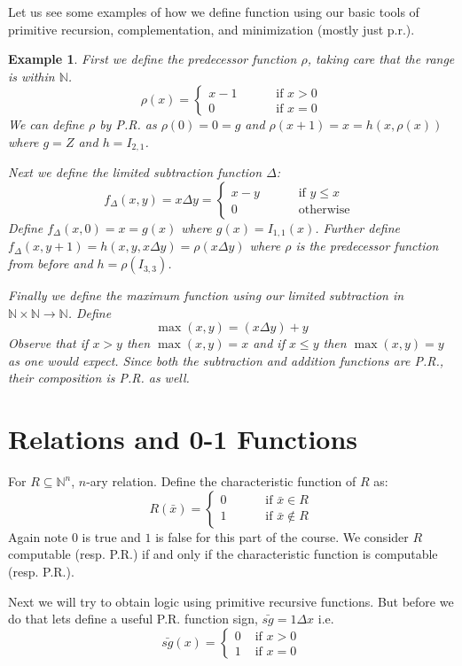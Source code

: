 \documentclass[twoside]{article}
\newtheorem{example}[theorem]{Example}
\def\N{\mathbb{N}}
\begin{document}
Let us see some examples of how we define function using our basic tools of primitive recursion, complementation, and minimization (mostly just p.r.).
\begin{example}
First we define the predecessor function $\rho$, taking care that the range is within $\N$. 
\[\rho(x) = \begin{cases}
x - 1 &\qquad \mbox{ if } x > 0 \\
0 &\qquad \mbox{ if } x = 0
\end{cases}\]
We can define $\rho$ by P.R. as $\rho (0) = 0 = g$ and $\rho(x+1) = x = h(x, \rho(x))$ where $g = Z$ and $h = I_{2,1}$. 

Next we define the limited subtraction function $\Delta$:
\[f_{\Delta}(x,y) = x \Delta y = \begin{cases}
x - y &\qquad \mbox{ if } y \leq x \\
0 &\qquad \mbox{ otherwise } 
\end{cases}\]
Define $f_{\Delta}(x, 0) = x = g(x)$ where $g(x) = I_{1,1}(x)$. Further define $f_{\Delta}(x, y+1) = h(x,y,x \Delta y) = \rho(x \Delta y)$ where $\rho$ is the predecessor function from before and $h = \rho(I_{3,3})$. 

Finally we define the maximum function using our limited subtraction in $\N \times \N \rightarrow \N$. Define
\[\max (x,y) = (x \Delta y) + y\]
Observe that if $x > y$ then $\max (x,y) = x$ and if $x \leq y$ then $\max (x,y) = y$ as one would expect. Since both the subtraction and addition functions are P.R., their composition is P.R. as well.
\end{example}

\section{Relations and 0-1 Functions}
For $R \subseteq \N^n$, $n$-ary relation.
Define the characteristic function of $R$ as:
\[R(\bar{x}) = \begin{cases}
0 &\qquad \mbox{ if } \bar{x} \in R \\
1 &\qquad \mbox{ if } \bar{x} \notin R
\end{cases} \]
Again note $0$ is true and $1$ is false for this part of the course. We consider $R$ computable (resp. P.R.) if and only if the characteristic function is computable (resp. P.R.).

Next we will try to obtain logic using primitive recursive functions. But before we do that lets define a useful P.R. function sign, $\bar{sg} = 1\Delta x$ i.e.
\[\bar{sg}(x) = \begin{cases}
0 &\mbox{ if } x > 0 \\
1 &\mbox{ if } x = 0
\end{cases}\]
\end{document}

